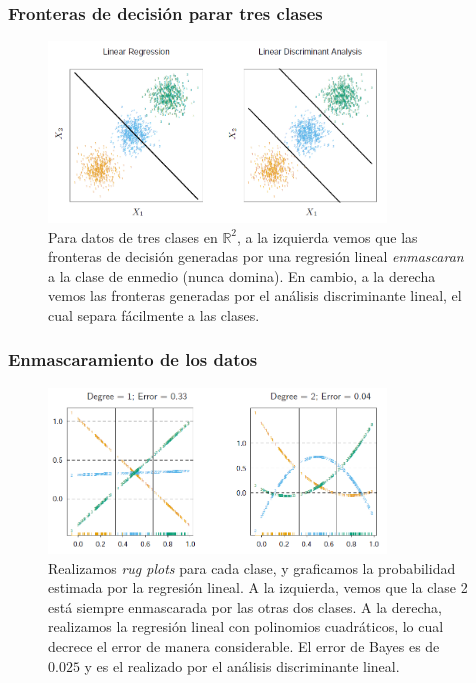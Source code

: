 \documentclass[usenames,dvipsnames]{beamer} %
\begin{document}
\begin{frame}\frametitle{Fronteras de decisi\'on parar tres clases}
\begin{figure}
	\centering
	\includegraphics[width=0.8\textwidth]{images/esl/fig_4_2.png}
	\caption{Para datos de tres clases en $\mathbb{R}^2$, a la izquierda vemos que las fronteras de decisi\'on generadas por una regresi\'on lineal \textit{enmascaran} a la clase de enmedio (nunca domina). En cambio, a la derecha vemos las fronteras generadas por el an\'alisis discriminante lineal, el cual separa f\'acilmente a las clases.}
	\label{fig:esl_4-2}
\end{figure}
\end{frame}

\begin{frame}\frametitle{Enmascaramiento de los datos}
\begin{figure}
	\centering
	\includegraphics[width=0.8\textwidth]{images/esl/fig_4_3.png}
	\caption{Realizamos \textit{rug plots} para cada clase, y graficamos la probabilidad estimada por la regresi\'on lineal. A la izquierda, vemos que la clase 2 est\'a siempre enmascarada por las otras dos clases. A la derecha, realizamos la regresi\'on lineal con polinomios cuadr\'aticos, lo cual decrece el error de manera considerable. El error de Bayes es de $0.025$ y es el realizado por el an\'alisis discriminante lineal.}
	\label{fig:esl_4-3}
\end{figure}
\end{frame}
\end{document}
